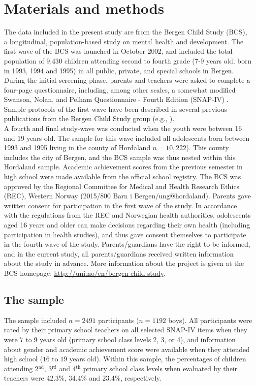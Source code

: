 \documentclass[10pt,letterpaper]{article}
\begin{document}
\section*{Materials and methods}
The data included in the present study are from the Bergen Child Study (BCS), a longitudinal, population-based study on mental health and development.
The first wave of the BCS was launched in October 2002, and included the total population of 9,430 children attending second to fourth grade (7-9 years old, born in 1993, 1994 and 1995) in all public, private, and special schools in Bergen. 
During the initial screening phase, parents and teachers were asked to complete a four-page questionnaire, including, among other scales, a somewhat modified Swanson, Nolan, and Pelham Questionnaire - Fourth Edition (SNAP-IV) \cite{Swanson1992}.
Sample protocols of the first wave have been described in several previous publications from the Bergen Child Study group 
(e.g., \cite{Heiervang2007, Lundervold2011, Sivertsen2015}).\\

A fourth and final study-wave was conducted when the youth were between 16 and 19 years old. The sample for this wave included all adolescents born between 1993 and 1995 living in the county of Hordaland $n=10,222$). This county includes the city of Bergen, and the BCS sample was thus nested within this Hordaland sample. Academic achievement scores from the previous semester in high school were made available from the official school registry.  The BCS was approved by the Regional Committee for Medical and Health Research Ethics (REC), Western Norway (2015/800 Barn i Bergen/ung$@$hordaland). Parents gave written consent for participation in the first wave of the study. In accordance with the regulations from the REC and Norwegian health authorities, adolescents aged 16 years and older can make decisions regarding their own health (including participation in health studies), and thus gave consent themselves to participate in the fourth wave of the study. Parents/guardians have the right to be informed, and in the current study, all parents/guardians received written information about the study in advance.
More information about the project is given at the BCS homepage: {\small \url{http://uni.no/en/bergen-child-study}}.

\vspace{3mm}
\subsection*{The sample}
The sample included $n=2491$ participants ($n=1192$ boys). All participants were rated by their primary school teachers on all selected SNAP-IV items when they were $7$ to $9$ years old (primary school class levels $2$, $3$, or $4$), and information about gender and academic achievement score were available when they attended high school ($16$ to $19$ years old).
Within this sample, the percentages of children attending 2$^{\text{nd}}$, 3$^{\text{rd}}$ and 4$^{\text{th}}$ primary school
 class levels when evaluated by their teachers were 
42.3\%, 34.4\% and 23.4\%, respectively. 
\end{document}
